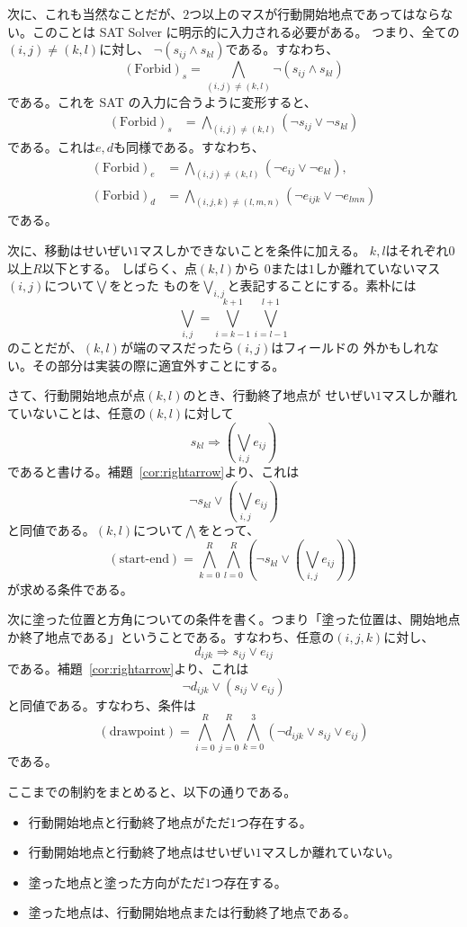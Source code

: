 次に、これも当然なことだが、$2$つ以上のマスが行動開始地点であってはならな
い。このことは SAT Solver に明示的に入力される必要がある。
つまり、全ての$(i, j) \neq (k, l)$に対し、
$\lnot (s_{ij} \land s_{kl})$である。すなわち、
\[
 (\text{Forbid})_s = 
 \bigwedge_{(i, j) \neq (k, l)} \lnot
 (s_{ij} \land s_{kl})
\]
である。これを SAT の入力に合うように変形すると、
\begin{align*}
 (\text{Forbid})_s &= \bigwedge_{(i, j) \neq (k, l)} (\lnot
 s_{ij} \lor \lnot s_{kl}) 
\end{align*}
である。これは$e, d$も同様である。すなわち、
\begin{align*}
 (\text{Forbid})_e &= \bigwedge_{(i, j) \neq (k, l)} (\lnot
 e_{ij} \lor \lnot e_{kl}), \\
 (\text{Forbid})_d &= \bigwedge_{(i, j, k) \neq (l, m, n)} (\lnot
 e_{ijk} \lor \lnot e_{lmn})
\end{align*}
である。

次に、移動はせいぜい$1$マスしかできないことを条件に加える。
$k, l$はそれぞれ$0$以上$R$以下とする。
しばらく、点$(k, l)$から
$0$または$1$しか離れていないマス$(i, j)$について$\bigvee$をとった
ものを$\bigvee_{i, j}$と表記することにする。素朴には
\[
 \bigvee_{i, j} = \bigvee_{i = k-1}^{k+1} \bigvee_{i = l-1}^{l+1} 
\]
のことだが、$(k, l)$が端のマスだったら$(i, j)$はフィールドの
外かもしれない。その部分は実装の際に適宜外すことにする。

さて、行動開始地点が点$(k, l)$のとき、行動終了地点が
せいぜい$1$マスしか離れていないことは、任意の$(k, l)$に対して
\[
 s_{kl} \Rightarrow \left( \bigvee_{i, j} e_{ij} \right)
\]
であると書ける。補題~\ref{cor:rightarrow}より、これは
\[
 \lnot s_{kl} \lor \left( \bigvee_{i, j} e_{ij} \right)
\]
と同値である。$(k, l)$について$\bigwedge$をとって、
\[
 (\text{start-end}) = \bigwedge_{k = 0}^R \bigwedge_{l = 0}^R 
 \left(\lnot s_{kl} \lor \left( \bigvee_{i, j} e_{ij} \right) \right)\
\]
が求める条件である。

次に塗った位置と方角についての条件を書く。つまり「塗った位置は、開始地点
か終了地点である」ということである。すなわち、任意の$(i, j, k)$に対し、
\[
 d_{ijk} \Longrightarrow s_{ij} \lor e_{ij}
\]
である。補題~\ref{cor:rightarrow}より、これは
\[
 \lnot d_{ijk} \lor (s_{ij} \lor e_{ij})
\]
と同値である。すなわち、条件は
\[
 (\text{drawpoint}) =
 \bigwedge_{i = 0}^{R} \bigwedge_{j = 0}^R \bigwedge_{k = 0}^3
 (\lnot d_{ijk} \lor s_{ij} \lor e_{ij})
\]
である。

\begin{rem}
 ここまでの制約をまとめると、以下の通りである。
 \begin{itemize}
  \item 行動開始地点と行動終了地点がただ$1$つ存在する。
  \item 行動開始地点と行動終了地点はせいぜい$1$マスしか離れていない。
  \item 塗った地点と塗った方向がただ$1$つ存在する。
  \item 塗った地点は、行動開始地点または行動終了地点である。
 \end{itemize}
\end{rem}

